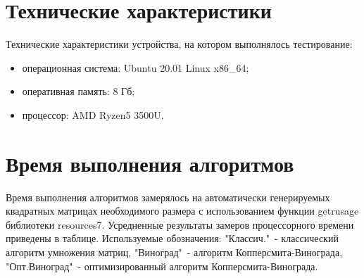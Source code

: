 \documentclass[12pt]{report}
\begin{document}
    \section{Технические характеристики}
    Технические характеристики устройства, на котором выполнялось тестирование:
    \begin{itemize}
        \item операционная система: Ubuntu 20.01 Linux x86\_64;
        \item оперативная память: 8 Гб;
        \item процессор: AMD Ryzen5 3500U.
    \end{itemize}


    \section{Время выполнения алгоритмов}

    Время выполнения алгоритмов замерялось на автоматически генерируемых квадратных матрицах необходимого размера
    с использованием функции getrusage библиотеки resources7.
    Усредненные результаты замеров процессорного времени приведены в таблице.
    Используемые обозначения: "Классич."\ - классический алгоритм умножения матриц,
    "Виноград"\ - алгоритм Копперсмита-Винограда,
    "Опт.Виноград"\ - оптимизированный алгоритм Копперсмита-Винограда.
\end{document}
